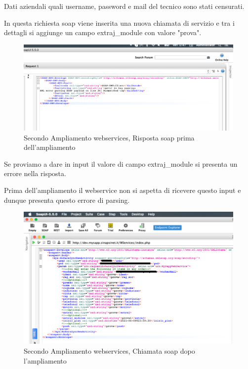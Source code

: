 	Dati aziendali quali username, password e mail del tecnico sono stati censurati.
	
	In questa richiesta \gls{soap} viene inserita una nuova chiamata di servizio e tra i dettagli si aggiunge un campo extraj\_module con valore "prova".

\begin{figure}[!h] 
	\centering
	\includegraphics[scale = 0.5]{immagini/webservices/ampliamenti/accettazione/2ampl_soap_risposta_premodifica.png}
	\caption{Secondo Ampliamento webservices, Risposta \gls{soap} prima dell'ampliamento}
	\label{fig:5-11}
\end{figure}

	Se proviamo a dare in input il valore di campo extraj\_module si presenta un errore nella risposta.
	
	Prima dell'ampliamento il webservice non si aspetta di ricevere questo input e dunque presenta questo errore di parsing.

\newpage

\begin{figure}[!h] 
	\centering
	\includegraphics[scale = 0.5]{immagini/webservices/ampliamenti/accettazione/2ampl_soap_chiamata_premodifica.png}
	\caption{Secondo Ampliamento webservices, Chiamata \gls{soap} dopo l'ampliamento}
\end{figure}


